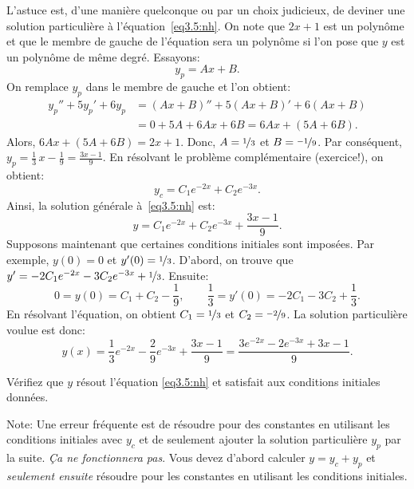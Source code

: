 L'astuce est, d'une manière quelconque ou par un choix judicieux, de deviner une solution particulière à 
l'équation~\eqref{eq3.5:nh}.  
On note que $2x+1$ est un polynôme et que le membre de gauche de l'équation sera un polynôme si l'on pose que $y$ est un polynôme de même degré. Essayons: 
\begin{equation*}
	y_p = Ax + B .
\end{equation*}
On remplace $y_p$ dans le membre de gauche et l'on obtient: 
\begin{align*}
	y_p'' + 5y_p'+ 6y_p & = (Ax+B)'' + 5(Ax+B)' + 6(Ax+B) \\
						& = 0 + 5A + 6Ax + 6B = 6Ax+ (5A+6B) .
\end{align*}
Alors, $6Ax+(5A+6B) = 2x+1$.  
Donc, $A = \nicefrac{1}{3}$ et $B = \nicefrac{-1}{9}$.
Par conséquent, $y_p = \frac{1}{3}\, x - \frac{1}{9} = \frac{3x-1}{9}$.
En résolvant le problème complémentaire (exercice!), on obtient: 
\begin{equation*}
	y_c = C_1 e^{-2x} + C_2 e^{-3x}.
\end{equation*}
Ainsi, la solution générale à~\eqref{eq3.5:nh} est: 
\begin{equation*}
	y = C_1 e^{-2x} + C_2 e^{-3x} + \frac{3x-1}{9} .
\end{equation*}
Supposons maintenant que certaines conditions initiales sont imposées. 
Par exemple,  $y(0) = 0$ et $y'(0) = \nicefrac{1}{3}$.  
D'abord, on trouve que $y' = - 2C_1 e^{-2x} - 3C_2 e^{-3x} + \nicefrac{1}{3}$.
Ensuite: 
\begin{equation*}
			0   = y(0)  = C_1 + C_2 -\frac{1}{9} , \qquad
	\frac{1}{3} = y'(0) = - 2C_1 - 3C_2 + \frac{1}{3} .
\end{equation*}
En résolvant l'équation, on obtient $C_1 = \nicefrac{1}{3}$ et $C_2 = \nicefrac{-2}{9}$.
La solution particulière voulue est donc:  
\begin{equation*}
	y(x) = \frac{1}{3} e^{-2x} - \frac{2}{9} e^{-3x} + \frac{3x-1}{9} 
		 = \frac{3 e^{-2x} - 2 e^{-3x} + 3x-1}{9} .
\end{equation*}

\begin{exercise}
	Vérifiez que $y$ résout  l'équation  \eqref{eq3.5:nh}
	et satisfait aux conditions initiales données.  
\end{exercise}

Note: Une erreur fréquente est de résoudre pour des constantes en utilisant les conditions initiales avec  $y_c$ et de seulement ajouter la solution particulière $y_p$ par la suite.
 \emph{Ça ne fonctionnera pas}.  Vous devez d'abord calculer $y = y_c + y_p$ et
\emph{seulement ensuite} résoudre pour les constantes en utilisant les conditions initiales. 

